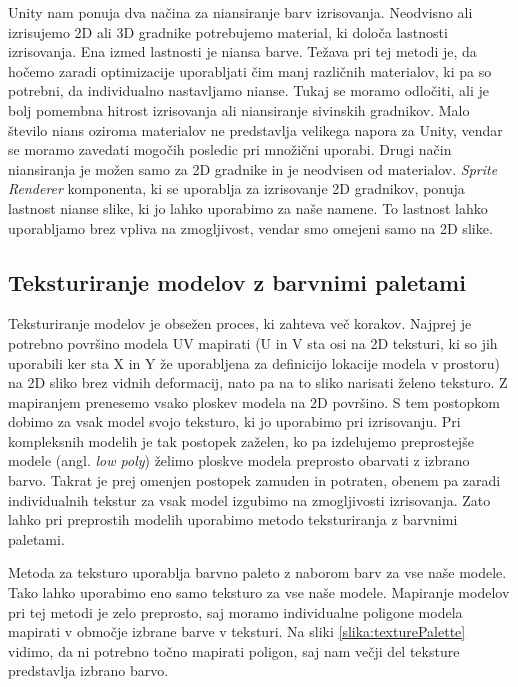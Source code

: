 \documentclass[12pt,a4paper,twoside]{book}
\begin{document}
Unity nam ponuja dva načina za niansiranje barv izrisovanja. Neodvisno ali izrisujemo 2D ali 3D gradnike potrebujemo material, ki določa lastnosti izrisovanja. Ena izmed lastnosti je niansa barve. Težava pri tej metodi je, da hočemo zaradi optimizacije uporabljati čim manj različnih materialov, ki pa so potrebni, da individualno nastavljamo nianse. Tukaj se moramo odločiti, ali je bolj pomembna hitrost izrisovanja ali niansiranje sivinskih gradnikov. Malo število nians oziroma materialov ne predstavlja velikega napora za Unity, vendar se moramo zavedati mogočih posledic pri množični uporabi. Drugi način niansiranja je možen samo za 2D gradnike in je neodvisen od materialov. \textit{Sprite Renderer} komponenta, ki se uporablja za izrisovanje 2D gradnikov, ponuja lastnost nianse slike, ki jo lahko uporabimo za naše namene. To lastnost lahko uporabljamo brez vpliva na zmogljivost, vendar smo omejeni samo na 2D slike.

\subsection{Teksturiranje modelov z barvnimi paletami}
Teksturiranje modelov je obsežen proces, ki zahteva več korakov. Najprej je potrebno površino modela UV mapirati (U in V sta osi na 2D teksturi, ki so jih uporabili ker sta X in Y že uporabljena za definicijo lokacije modela v prostoru) na 2D sliko brez vidnih deformacij, nato pa na to sliko narisati želeno teksturo. Z mapiranjem prenesemo vsako ploskev modela na 2D površino. S tem postopkom dobimo za vsak model svojo teksturo, ki jo uporabimo pri izrisovanju. Pri kompleksnih modelih je tak postopek zaželen, ko pa izdelujemo preprostejše modele (angl. \textit{low poly}) želimo ploskve modela preprosto obarvati z izbrano barvo. Takrat je prej omenjen postopek zamuden in potraten, obenem pa zaradi individualnih tekstur za vsak model izgubimo na zmogljivosti izrisovanja. Zato lahko pri preprostih modelih uporabimo metodo teksturiranja z barvnimi paletami.

Metoda za teksturo uporablja barvno paleto z naborom barv za vse naše modele. Tako lahko uporabimo eno samo teksturo za vse naše modele. Mapiranje modelov pri tej metodi je zelo preprosto, saj moramo individualne poligone modela mapirati v območje izbrane barve v teksturi. Na sliki \ref{slika:texturePalette} vidimo, da ni potrebno točno mapirati poligon, saj nam večji del teksture predstavlja izbrano barvo. 
\end{document}
